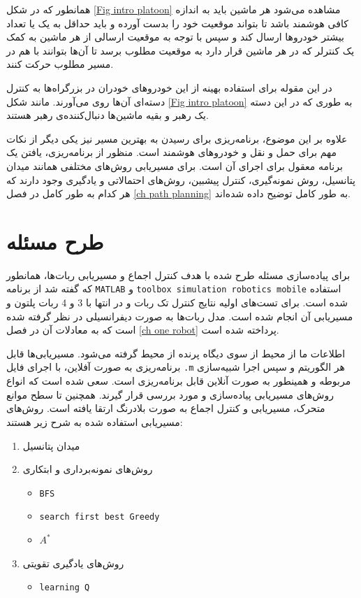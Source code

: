 همانطور که در شکل \ref{Fig intro platoon} مشاهده می‌شود هر ماشین باید به اندازه کافی هوشمند باشد تا بتواند موقعیت خود را بدست آورده و باید حداقل به یک یا تعداد بیشتر خودروها ارسال کند و سپس با توجه به موقعیت ارسالی از هر ماشین به کمک یک کنترلر که در هر ماشین قرار دارد به موقعیت مطلوب برسد تا آن‌ها بتوانند با هم در مسیر مطلوب حرکت کنند.

در این مقوله برای استفاده بهینه از این خودروهای خودران در بزرگراه‌ها به کنترل دسته‌ای آن‌ها روی می‌آورند. مانند شکل \ref{Fig intro platoon} به طوری که در این دسته یک رهبر و بقیه ماشین‌ها دنبال‌کننده‌ی رهبر هستند.

علاوه بر این موضوع، برنامه‌ریزی برای رسیدن به بهترین مسیر نیز یکی دیگر از نکات مهم برای حمل و نقل و خودروهای هوشمند است. منظور از برنامه‌ریزی، یافتن یک برنامه معقول برای اجرای آن است. برای مسیریابی روش‌های مختلفی همانند میدان پتانسیل، روش نمونه‌گیری، کنترل پیشبین، روش‌های احتمالاتی\cite{lefkopoulos2019using} و یادگیری وجود دارند که هر کدام به طور کامل در فصل \ref{ch path planning} به طور کامل توضیح داده شده‌اند.

\section{طرح مسئله}
برای پیاده‌سازی مسئله طرح شده با هدف کنترل اجماع و مسیریابی ربات‌ها، همانطور که گفته شد از برنامه \verb|MATLAB| و \verb|toolbox simulation robotics mobile| استفاده شده است. برای تست‌های اولیه نتایج کنترل تک ربات و در انتها با 3 و 4 ربات پلتون و مسیریابی آن انجام شده است. مدل ربات‌ها به صورت دیفرانسیلی در نظر گرفته شده است که به معادلات آن در فصل \ref{ch one robot} پرداخته شده است.

اطلاعات ما از محیط از سوی دیگاه پرنده از محیط گرفته می‌شود. مسیریابی‌ها قابل برنامه‌ریزی به صورت آفلاین، با اجرای فایل \verb|.m| هر الگوریتم و سپس اجرا شبیه‌سازی مربوطه و همینطور به صورت آنلاین قابل برنامه‌ریزی است. سعی شده است که انواع روش‌های مسیریابی پیاده‌سازی و مورد بررسی قرار گیرند. همچنین تا سطح موانع متحرک، مسیریابی و کنترل اجماع به صورت بلادرنگ ارتقا یافته است.
روش‌های مسیریابی استفاده شده به شرح زیر هستند:
\begin{enumerate}
	\item میدان پتانسیل
	\item روش‌های نمونه‌برداری و ابتکاری
	\begin{itemize}
		\item \verb|BFS|
		\item \verb|search first best Greedy|
		\item $A^*$
	\end{itemize}
	\item روش‌های یادگیری تقویتی
	\begin{itemize}
		\item \verb|learning Q|
	\end{itemize}
\end{enumerate}

